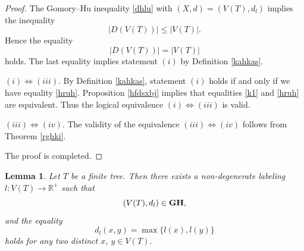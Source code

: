 \documentclass[pdflatex,sn-mathphys-num]{sn-jnl}%
\theoremstyle{thmstyleone}%
\newtheorem{Lemma}[Theorem]{Lemma}
\theoremstyle{thmstyletwo}%
\theoremstyle{thmstylethree}%
\theoremstyle{thmstyletwo}%
\theoremstyle{thmstylethree}%
\begin{document}
\begin{proof}
The Gomory--Hu inequality \eqref{dhlu} with $(X,d) = (V(T), d_l)$ implies the  inequality
\begin{equation}
    \label{kam2}
|D(V(T))| \le |V(T)|.
\end{equation}
Hence the equality
\begin{equation}
    \label{hruh}
|D(V(T))| = |V(T)|
\end{equation}
holds. The last equality implies statement $(i)$ by Definition \ref{kahkas}.




$(i) \Leftrightarrow (iii)$. By Definition \ref{kahkas}, statement $(i)$ holds if and only if  we have equality \eqref{hruh}. Proposition \ref{hfdsxbj} implies that equalities \eqref{k1} and \eqref{hruh} are equivalent. Thus the logical equivalence $(i) \Leftrightarrow (iii)$ is valid. 

$(iii) \Leftrightarrow (iv)$. The validity of the equivalence 
$(iii) \Leftrightarrow (iv)$ follows from Theorem \ref{rghki}.

The proof is completed. 
\end{proof} 









\begin{Lemma}\label{ifff}
Let $T$ be a finite tree. Then there exists a non-degenerate labeling 
\(
l : V(T) \to \mathbb{R}^+
\)
such that 
\begin{equation}
    \label{uutt}
    (V(T), d_l) \in {\bf GH},
\end{equation}
and  the equality
\begin{equation}
    \label{fni}
d_l(x,y)= \max\{l(x), l(y)\}
\end{equation}
holds for any two distinct $x$, $y\in V(T)$.
\end{Lemma}
\end{document}
